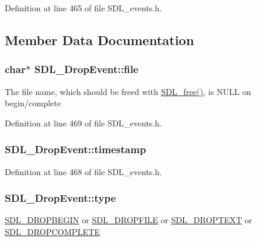 Definition at line 465 of file S\-D\-L\-\_\-events.\-h.



\subsection{Member Data Documentation}
\hypertarget{struct_s_d_l___drop_event_abc41ef4beb62e1d8b56827128b29585f}{
\subsubsection[{file}]{\setlength{\rightskip}{0pt plus 5cm}char$\ast$ S\-D\-L\-\_\-\-Drop\-Event\-::file}}\label{struct_s_d_l___drop_event_abc41ef4beb62e1d8b56827128b29585f}
The file name, which should be freed with \hyperlink{_s_d_l__stdinc_8h_a0e4ade894d550ada1fa19dc2d46e88b8}{S\-D\-L\-\_\-free()}, is N\-U\-L\-L on begin/complete 

Definition at line 469 of file S\-D\-L\-\_\-events.\-h.

\hypertarget{struct_s_d_l___drop_event_a02d2c81bb22db632a40cd0021ff751ab}{
\subsubsection[{timestamp}]{ S\-D\-L\-\_\-\-Drop\-Event\-::timestamp}}\label{struct_s_d_l___drop_event_a02d2c81bb22db632a40cd0021ff751ab}


Definition at line 468 of file S\-D\-L\-\_\-events.\-h.

\hypertarget{struct_s_d_l___drop_event_a5ea27cfaa5f8d4940e9a69b68b3cc035}{
\subsubsection[{type}]{ S\-D\-L\-\_\-\-Drop\-Event\-::type}}\label{struct_s_d_l___drop_event_a5ea27cfaa5f8d4940e9a69b68b3cc035}
\hyperlink{_s_d_l__events_8h_a3b589e89be6b35c02e0dd34a55f3fccaa0809886c132aaf734fff6f2abf466912}{S\-D\-L\-\_\-\-D\-R\-O\-P\-B\-E\-G\-I\-N} or \hyperlink{_s_d_l__events_8h_a3b589e89be6b35c02e0dd34a55f3fccaad9238862d7aeaebff88be6453ee0fbab}{S\-D\-L\-\_\-\-D\-R\-O\-P\-F\-I\-L\-E} or \hyperlink{_s_d_l__events_8h_a3b589e89be6b35c02e0dd34a55f3fccaa1d97f901333e40b0ccc4dff1a319213f}{S\-D\-L\-\_\-\-D\-R\-O\-P\-T\-E\-X\-T} or \hyperlink{_s_d_l__events_8h_a3b589e89be6b35c02e0dd34a55f3fccaaa83e80a89d5c4ff14889d07dddc402ef}{S\-D\-L\-\_\-\-D\-R\-O\-P\-C\-O\-M\-P\-L\-E\-T\-E} 

